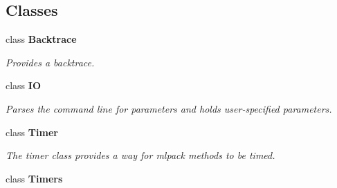 \subsection*{Classes}
\begin{DoxyCompactItemize}
\item 
class \textbf{ Backtrace}
\begin{DoxyCompactList}\small\item\em Provides a backtrace. \end{DoxyCompactList}\item 
class \textbf{ IO}
\begin{DoxyCompactList}\small\item\em Parses the command line for parameters and holds user-\/specified parameters. \end{DoxyCompactList}\item 
class \textbf{ Timer}
\begin{DoxyCompactList}\small\item\em The timer class provides a way for mlpack methods to be timed. \end{DoxyCompactList}\item 
class \textbf{ Timers}
\end{DoxyCompactItemize}
